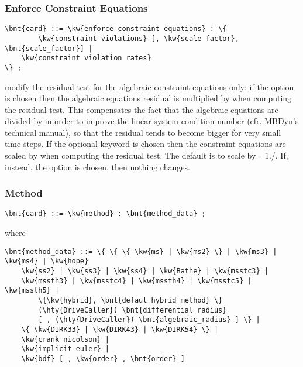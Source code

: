 \subsubsection{Enforce Constraint Equations}
\begin{Verbatim}[commandchars=\\\{\}]
    \bnt{card} ::= \kw{enforce constraint equations} : \{
    	\kw{constraint violations} [, \kw{scale factor}, \bnt{scale_factor}] | 
	\kw{constraint violation rates} 
\} ;
\end{Verbatim}
modify the residual test for the algebraic constraint equations only:
if the option  is chosen then the algebraic equations
residual is multiplied by  when computing the residual test.
This compensates the fact that the algebraic equations are divided by 
 in order to improve the linear system condition number (cfr. MBDyn's
technical manual), so that the residual tends to become bigger for very small time steps.
If the optional keyword  is chosen then 
the constraint equations are scaled by  when computing the residual test.
The default is to scale by =1./.
If, instead, the option  is chosen, then nothing changes.

\subsubsection{Method}
\begin{Verbatim}[commandchars=\\\{\}]
    \bnt{card} ::= \kw{method} : \bnt{method_data} ;
\end{Verbatim}

where

\begin{Verbatim}[commandchars=\\\{\}]
    \bnt{method_data} ::= \{ \{ \{ \kw{ms} | \kw{ms2} \} | \kw{ms3} | \kw{ms4} | \kw{hope} 
    \kw{ss2} | \kw{ss3} | \kw{ss4} | \kw{Bathe} | \kw{msstc3} | 
    \kw{mssth3} | \kw{msstc4} | \kw{mssth4} | \kw{msstc5} | \kw{mssth5} |
        \{\kw{hybrid}, \bnt{defaul_hybrid_method} \} 
        (\hty{DriveCaller}) \bnt{differential_radius}
        [ , (\hty{DriveCaller}) \bnt{algebraic_radius} ] \} | 
    \{ \kw{DIRK33} | \kw{DIRK43} | \kw{DIRK54} \} |
    \kw{crank nicolson} | 
    \kw{implicit euler} | 
    \kw{bdf} [ , \kw{order} , \bnt{order} ]\end{Verbatim}

